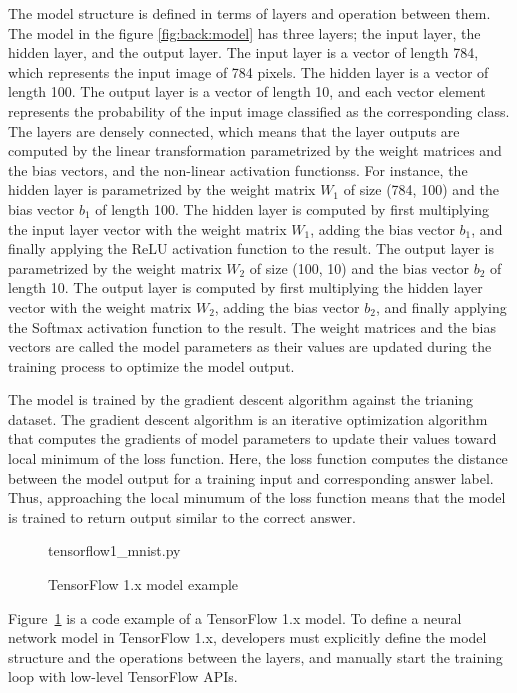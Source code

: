 The model structure is defined in terms of layers and operation between them.
The model in the figure \ref{fig:back:model} has three layers;
the input layer, the hidden layer, and the output layer.
The input layer is a vector of length 784, which represents the input image
of 784 pixels.
The hidden layer is a vector of length 100.
The output layer is a vector of length 10, and each vector element represents 
the probability of the input image classified as the corresponding class.
The layers are densely connected, which means that
the layer outputs are computed by the linear transformation parametrized by
the weight matrices and the bias vectors, 
and the non-linear activation functionss. 
For instance, the hidden layer is parametrized by the weight matrix
$W_1$ of size (784, 100) and the bias vector $b_1$ of length 100.
The hidden layer is computed by first multiplying the input layer vector
with the weight matrix $W_1$, adding the bias vector $b_1$, and finally applying
the ReLU activation function to the result.
The output layer is parametrized by the weight matrix $W_2$ of size (100, 10)
and the bias vector $b_2$ of length 10.
The output layer is computed by first multiplying the hidden layer vector
with the weight matrix $W_2$, adding the bias vector $b_2$, and finally applying
the Softmax activation function to the result.
The weight matrices and the bias vectors are called the model parameters 
as their values are updated during the training process 
to optimize the model output.

The model is trained by the gradient descent algorithm against the trianing
dataset. The gradient descent algorithm is an iterative optimization algorithm
that computes the gradients of model parameters to update their values toward
local minimum of the loss function.
Here, the loss function computes the distance between the model output for
a training input and corresponding answer label.
Thus, approaching the local minumum of the loss function means that the
model is trained to return output similar to the correct answer.

\begin{figure}[ht!]

{tensorflow1_mnist.py}
  \caption{TensorFlow 1.x model example}
\label{fig:back:tf1}
\end{figure}

Figure~\ref{fig:back:tf1} is a code example of a TensorFlow 1.x model.
To define a neural network model in TensorFlow 1.x, 
developers must explicitly define the model structure
and the operations between the layers, 
and manually start the training loop with low-level TensorFlow APIs.

